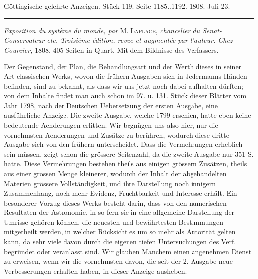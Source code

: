 \clearpage
{}
\begin{center}\small Göttingische gelehrte Anzeigen. Stück 119. Seite 1185..1192. 1808. Juli 23.\\[3pt]\rule{.72\linewidth}{.3pt}\end{center}

\emph{Exposition du système du monde, par} M. \textsc{Laplace}, \emph{chancelier du Senat-Conservateur etc. Troisième édition, revue et augmentée par l'auteur. Chez Courcier,} 1808. 405 Seiten in Quart. Mit dem Bildnisse des Verfassers.

Der Gegenstand, der Plan, die Behandlungsart und der Werth dieses in seiner Art classischen Werks, wovon die frühern Ausgaben sich in Jedermanns Händen befinden, sind zu bekannt, als dass wir uns jetzt noch dabei aufhalten dürften; von dem Inhalte findet man auch schon im 97. u. 131. Stück dieser Blätter vom Jahr 1798, nach der Deutschen Uebersetzung der ersten Ausgabe, eine ausführliche Anzeige. Die zweite Ausgabe, welche 1799 erschien, hatte eben keine bedeutende Aenderungen erlitten. Wir begnügen uns also hier, nur die vornehmsten Aenderungen und Zusätze zu berühren, wodurch diese dritte Ausgabe sich von den frühern unterscheidet. Dass die Vermehrungen erheblich sein müssen, zeigt schon die grössere Seitenzahl, da die zweite Ausgabe nur 351 S. hatte. Diese Vermehrungen bestehen theils aus einigen grössern Zusätzen, theils aus einer grossen Menge kleinerer, wodurch der Inhalt der abgehandelten Materien grössere Vollständigkeit, und ihre Darstellung noch innigern Zusammenhang, noch mehr Evidenz, Fruchtbarkeit und Interesse erhält. Ein besonderer Vorzug dieses Werks besteht darin, dass von den numerischen Resultaten der Astronomie, in so fern sie in eine allgemeine Darstellung der Umrisse gehören können, die neuesten und bewährtesten Bestimmungen mitgetheilt werden, in welcher Rücksicht es um so mehr als Autorität gelten kann, da sehr viele davon durch die eigenen tiefen Untersuchungen des Verf. begründet oder veranlasst sind. Wir glauben Manchem einen angenehmen Dienst zu erweisen, wenn wir die vornehmsten davon, die seit der 2. Ausgabe neue Verbesserungen erhalten haben, in dieser Anzeige ausheben. 

